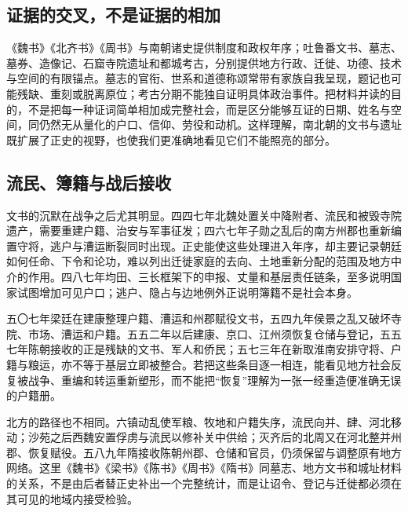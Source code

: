 \subsection{证据的交叉，不是证据的相加}

《魏书》《北齐书》《周书》与南朝诸史提供制度和政权年序；吐鲁番文书、墓志、墓券、造像记、石窟寺院遗址和都城考古，分别提供地方行政、迁徙、功德、技术与空间的有限锚点。墓志的官衔、世系和道德称颂常带有家族自我呈现，题记也可能残缺、重刻或脱离原位；考古分期不能独自证明具体政治事件。把材料并读的目的，不是把每一种证词简单相加成完整社会，而是区分能够互证的日期、姓名与空间，同仍然无从量化的户口、信仰、劳役和动机。这样理解，南北朝的文书与遗址既扩展了正史的视野，也使我们更准确地看见它们不能照亮的部分。

\subsection{流民、簿籍与战后接收}

文书的沉默在战争之后尤其明显。四四七年北魏处置关中降附者、流民和被毁寺院遗产，需要重建户籍、治安与军事征发；四六七年子勋之乱后的南方州郡也重新编置守将，逃户与漕运断裂同时出现。正史能使这些处理进入年序，却主要记录朝廷如何任命、下令和论功，难以列出迁徙家庭的去向、土地重新分配的范围及地方中介的作用。四八七年均田、三长框架下的申报、丈量和基层责任链条，至多说明国家试图增加可见户口；逃户、隐占与边地例外正说明簿籍不是社会本身。

五〇七年梁廷在建康整理户籍、漕运和州郡赋役文书，五四九年侯景之乱又破坏寺院、市场、漕运和户籍。五五二年以后建康、京口、江州须恢复仓储与登记，五五七年陈朝接收的正是残缺的文书、军人和侨民；五七三年在新取淮南安排守将、户籍与粮运，亦不等于基层立即被整合。若把这些条目逐一相连，能看见地方社会反复被战争、重编和转运重新塑形，而不能把“恢复”理解为一张一经重造便准确无误的户籍册。

北方的路径也不相同。六镇动乱使军粮、牧地和户籍失序，流民向并、肆、河北移动；沙苑之后西魏安置俘虏与流民以修补关中供给；灭齐后的北周又在河北整并州郡、恢复赋役。五八九年隋接收陈朝州郡、仓储和官员，仍须保留与调整原有地方网络。这里《魏书》《梁书》《陈书》《周书》《隋书》同墓志、地方文书和城址材料的关系，不是由后者替正史补出一个完整统计，而是让诏令、登记与迁徙都必须在其可见的地域内接受检验。
